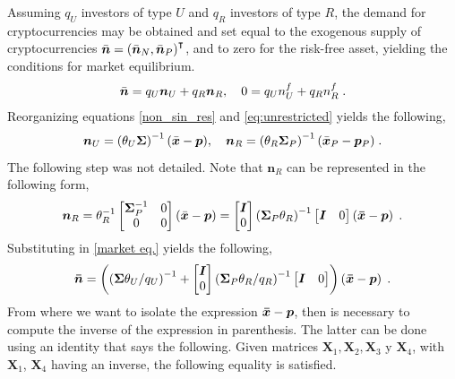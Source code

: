 Assuming $q_{U}$ investors of type $U$ and $q_R$ investors of type $R$, the demand for cryptocurrencies may be obtained and set equal to the exogenous supply of cryptocurrencies $\Bar{\bm{n}} = \left(\Bar{\bm{n}}_N, \Bar{\bm{n}}_P\right)^{\intercal}$, and to zero for the risk-free asset, yielding the conditions for market equilibrium.
\begin{equation}
	\Bar{\bm{n}} = q_{U}\bm{n}_{U} + q_{R}\bm{n}_{R},\quad 0 = q_{U}n^{f}_{U} + q_{R}n^{f}_{R}\;.\label{market eq.}
\end{equation}
Reorganizing equations \eqref{non_sin_res} and \eqref{eq:unrestricted} yields the following,
\begin{equation*}
	\bm{n}_{U} = \left(\theta_{U}\bm{\Sigma}\right)^{-1}(\Bar{\bm{x}} - \bm{p}),\quad \bm{n}_{R} = \left(\theta_{R}\bm{\Sigma}_{P}\right)^{-1}(\Bar{\bm{x}}_{P} - \bm{p}_{P})\;. 
\end{equation*}
The following step was not detailed. Note that $\bm{n}_R$ can be represented in the following form,
\begin{equation*}
	\bm{n}_R = \theta^{-1}_{R}\begin{bmatrix}
		\bm{\Sigma}^{-1}_{P} & 0\\
		0 & 0
	\end{bmatrix}
	(\Bar{\bm{x}}-\bm{p}) = \begin{bmatrix}
		\bm{I}\\
		0
	\end{bmatrix}
	\left(\bm{\Sigma}_P\theta_R\right)^{-1}\begin{bmatrix}
		\bm{I} & 0
	\end{bmatrix}
	\left(\bm{\Bar{x}}-\bm{p}\right)\;.
\end{equation*}
Substituting in \eqref{market eq.} yields the following,
\begin{equation}
	\bm{\Bar{n}}=\left(\left(\bm{\Sigma}\theta_U/q_U\right)^{-1}+\begin{bmatrix}
		\bm{I}\\
		0
	\end{bmatrix}
	\left(\bm{\Sigma}_P \theta_R/q_R\right)^{-1}\begin{bmatrix}
		\bm{I} & 0
	\end{bmatrix}\right)\left(\bm{\Bar{\bm{x}}}-\bm{p}\right)\;.
	\label{eq:dem_exogena}
\end{equation}
From where we want to isolate the expression $\bm{\Bar{x}}-\bm{p}$, then is necessary to compute the inverse of the expression in parenthesis. The latter can be done using an identity \parencite{Soderstrom2002} that says the following. Given matrices $\bm{X}_1, \bm{X}_2, \bm{X}_3 \text{ y } \bm{X}_4$, with $\bm{X}_1$, $\bm{X}_4$ having an inverse, the following equality is satisfied.
